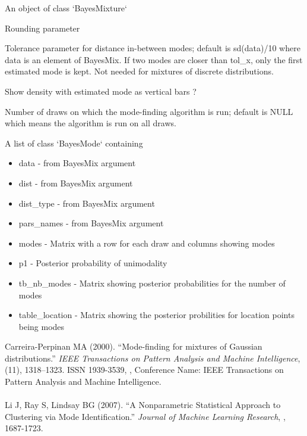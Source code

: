 \documentclass[a4paper]{book}
\begin{document}
\begin{Arguments}
\begin{ldescription}
\item[\code{BayesMix}] An object of class `BayesMixture`

\item[\code{rd}] Rounding parameter

\item[\code{tol\_x}] Tolerance parameter for distance in-between modes; default is sd(data)/10 where data is an element of BayesMix.
If two modes are closer than tol\_x, only the first estimated mode is kept.
Not needed for mixtures of discrete distributions.

\item[\code{show\_plot}] Show density with estimated mode as vertical bars ?

\item[\code{nb\_iter}] Number of draws on which the mode-finding algorithm is run; default is NULL which means the algorithm is run on all draws.
\end{ldescription}
\end{Arguments}
%
\begin{Value}
A list of class `BayesMode` containing
\begin{itemize}

\item{} data - from BayesMix argument
\item{} dist - from BayesMix argument
\item{} dist\_type - from BayesMix argument
\item{} pars\_names - from BayesMix argument
\item{} modes - Matrix with a row for each draw and columns showing modes
\item{} p1 - Posterior probability of unimodality
\item{} tb\_nb\_modes - Matrix showing posterior probabilities for the number of modes
\item{} table\_location - Matrix showing the posterior probilities for location points being modes

\end{itemize}

\end{Value}
%
\begin{References}\relax
Carreira-Perpinan MA (2000).
``Mode-finding for mixtures of Gaussian distributions.''
\emph{IEEE Transactions on Pattern Analysis and Machine Intelligence}, (11), 1318--1323.
ISSN 1939-3539, , Conference Name: IEEE Transactions on Pattern Analysis and Machine Intelligence.\\{}\\{}
Li J, Ray S, Lindsay BG (2007).
``A Nonparametric Statistical Approach to Clustering via Mode Identiﬁcation.''
\emph{Journal of Machine Learning Research}, , 1687-1723.
\end{References}
\end{document}
